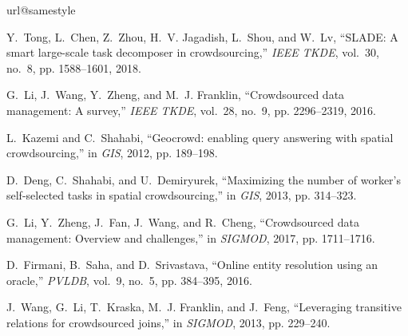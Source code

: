 \documentclass[11pt]{article}
\begin{document}


\begin{thebibliography}{10}
	\providecommand{\url}[1]{#1}
	\csname url@samestyle\endcsname
	\providecommand{\newblock}{\relax}
	\providecommand{\bibinfo}[2]{#2}
	\providecommand{\BIBentrySTDinterwordspacing}{\spaceskip=0pt\relax}
	\providecommand{\BIBentryALTinterwordstretchfactor}{4}
	\providecommand{\BIBentryALTinterwordspacing}{\spaceskip=\fontdimen2\font plus
		\BIBentryALTinterwordstretchfactor\fontdimen3\font minus
		\fontdimen4\font\relax}
	\providecommand{\BIBforeignlanguage}[2]{{%
			\expandafter\ifx\csname l@#1\endcsname\relax
			\typeout{** WARNING: IEEEtran.bst: No hyphenation pattern has been}%
			\typeout{** loaded for the language `#1'. Using the pattern for}%
			\typeout{** the default language instead.}%
			\else
			\language=\csname l@#1\endcsname
			\fi
			#2}}
	\providecommand{\BIBdecl}{\relax}
	\BIBdecl
	
	Y.~Tong, L.~Chen, Z.~Zhou, H.~V. Jagadish, L.~Shou, and W.~Lv, ``{SLADE:} {A}
	smart large-scale task decomposer in crowdsourcing,'' \emph{{IEEE} TKDE},
	vol.~30, no.~8, pp. 1588--1601, 2018.
	
	G.~Li, J.~Wang, Y.~Zheng, and M.~J. Franklin, ``Crowdsourced data management:
	{A} survey,'' \emph{{IEEE} TKDE}, vol.~28, no.~9, pp. 2296--2319, 2016.
	
	L.~Kazemi and C.~Shahabi, ``Geocrowd: enabling query answering with spatial
	crowdsourcing,'' in \emph{GIS}, 2012, pp. 189--198.
	
	D.~Deng, C.~Shahabi, and U.~Demiryurek, ``Maximizing the number of worker's
	self-selected tasks in spatial crowdsourcing,'' in \emph{GIS}, 2013, pp.
	314--323.
	
	G.~Li, Y.~Zheng, J.~Fan, J.~Wang, and R.~Cheng, ``Crowdsourced data management:
	Overview and challenges,'' in \emph{SIGMOD}, 2017, pp. 1711--1716.
	
	D.~Firmani, B.~Saha, and D.~Srivastava, ``Online entity resolution using an
	oracle,'' \emph{{PVLDB}}, vol.~9, no.~5, pp. 384--395, 2016.
	
	J.~Wang, G.~Li, T.~Kraska, M.~J. Franklin, and J.~Feng, ``Leveraging transitive
	relations for crowdsourced joins,'' in \emph{{SIGMOD}}, 2013, pp. 229--240.
	

\end{thebibliography}
\end{document}
